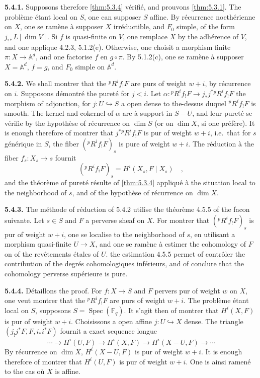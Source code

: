 \documentclass[12pt,a4paper]{article}
\theoremstyle{plain}
\theoremstyle{definition}
\DeclareMathOperator{\Spec}{Spec}
\newcommand{\into}{\hookrightarrow}
\providecommand{\Spec}{\operatorname{Spec}}
\begin{document}
{{\noindent\textbf{5.4.1.} Supposons therefore \ref{thm:5.3.4} v\'{e}rifi\'{e}, and prouvons \ref{thm:5.3.1}. The probl\`{e}me \'{e}tant local on $S$, one can supposer $S$ affine. By r\'{e}currence noeth\'{e}rienne on $X$, one se ram\`{e}ne \`{a} supposer $X$ irr\'{e}ductible, and $F_{0}$ simple, of the form $j_{!*}L[\dim V]$. Si $f$ is quasi-finite on $V$, one remplace $X$ by the adh\'{e}rence of $V$, and one applique 4.2.3, 5.1.2(e). Otherwise, one choisit a morphism finite $\pi: X \to \mathbb{A}^{d}$, and one factorise $f$ en $g \circ \pi$. By 5.1.2(c), one se ram\`{e}ne \`{a} supposer $X = \mathbb{A}^{d}$, $f = g$, and $F_{0}$ simple on $\mathbb{A}^{d}$.

\noindent\textbf{5.4.2.} We shall montrer that the ${}^{p}R^{i}f_{!}F$ are purs of weight $w+i$, by r\'{e}currence on $i$. Supposons d\'{e}montr\'{e} the puret\'{e} for $j < i$. Let $\alpha: {}^{p}R^{i}f_{!}F \to j_{*}j^{*}{}^{p}R^{i}f_{!}F$ the morphism of adjonction, for $j: U \into S$ a open dense to the-dessus duquel ${}^{p}R^{i}f_{!}F$ is smooth. The kernel and cokernel of $\alpha$ are \`{a} support in $S-U$, and leur puret\'{e} se v\'{e}rifie by the hypoth\`{e}se of r\'{e}currence on $\dim S$ (or on $\dim X$, si one pr\'{e}f\`{e}re). It is enough therefore of montrer that $j^{*}{}^{p}R^{i}f_{!}F$ is pur of weight $w+i$, i.e.\ that for $s$ g\'{e}n\'{e}rique in $S$, the fiber $({}^{p}R^{i}f_{!}F)_{s}$ is pure of weight $w+i$. The r\'{e}duction \`{a} the fiber $f_{s}: X_{s} \to s$ fournit
\[
({}^{p}R^{i}f_{!}F)_{s} = H^{i}(X_{s}, F \mid X_{s})\quad,
\]
and the th\'{e}or\`{e}me of puret\'{e} r\'{e}sulte of \ref{thm:5.3.4} appliqu\'{e} \`{a} the situation local to the neighborhood of $s$, and of the hypoth\`{e}se of r\'{e}currence on $\dim X$.

\noindent\textbf{5.4.3.} The m\'{e}thode of r\'{e}duction of 5.4.2 utilise the th\'{e}or\`{e}me 4.5.5 of the facon suivante. Let $s \in S$ and $F$ a perverse sheaf on $X$. For montrer that $({}^{p}R^{i}f_{!}F)_{s}$ is pur of weight $w+i$, one se localise to the neighborhood of $s$, en utilisant a morphism quasi-finite $U \to X$, and one se ram\`{e}ne \`{a} estimer the cohomology of $F$ on of the rev\^{e}tements \'{e}tales of $U$. the estimation 4.5.5 permet of contr\^{o}ler the contribution of the degr\'{e}s cohomologiques inf\'{e}rieurs, and of conclure that the cohomology perverse sup\'{e}rieure is pure.

\noindent\textbf{5.4.4.} D\'{e}taillons the proof. For $f: X \to S$ and $F$ pervers pur of weight $w$ on $X$, one veut montrer that the ${}^{p}R^{i}f_{!}F$ are purs of weight $w+i$. The probl\`{e}me \'{e}tant local on $S$, supposons $S = \Spec(\mathbb{F}_{q})$. It s'agit then of montrer that $H^{i}(X,F)$ is pur of weight $w+i$. Choisissons a open affine $j: U \into X$ dense. The triangle $(j_{!}j^{*}F, F, i_{*}i^{*}F)$ fournit a exact sequence longue
\[
\cdots \to H^{i}(U,F) \to H^{i}(X,F) \to H^{i}(X-U,F) \to \cdots
\]
By r\'{e}currence on $\dim X$, $H^{i}(X-U,F)$ is pur of weight $w+i$. It is enough therefore of montrer that $H^{i}(U,F)$ is pur of weight $w+i$. One is ainsi ramen\'{e} to the cas o\`{u} $X$ is affine.

}}
\end{document}
